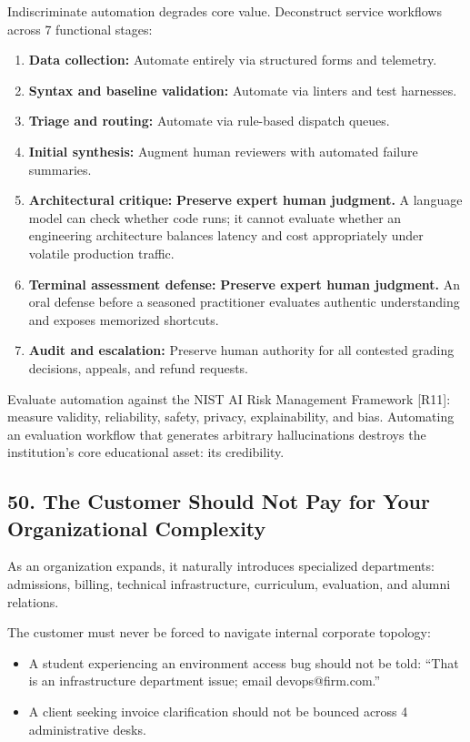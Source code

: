 Indiscriminate automation degrades core value. Deconstruct service workflows across 7 functional stages:
\begin{enumerate}
    \item \textbf{Data collection:} Automate entirely via structured forms and telemetry.
    \item \textbf{Syntax and baseline validation:} Automate via linters and test harnesses.
    \item \textbf{Triage and routing:} Automate via rule-based dispatch queues.
    \item \textbf{Initial synthesis:} Augment human reviewers with automated failure summaries.
    \item \textbf{Architectural critique:} \textbf{Preserve expert human judgment.} A language model can check whether code runs; it cannot evaluate whether an engineering architecture balances latency and cost appropriately under volatile production traffic.
    \item \textbf{Terminal assessment defense:} \textbf{Preserve expert human judgment.} An oral defense before a seasoned practitioner evaluates authentic understanding and exposes memorized shortcuts.
    \item \textbf{Audit and escalation:} Preserve human authority for all contested grading decisions, appeals, and refund requests.
\end{enumerate}

Evaluate automation against the NIST AI Risk Management Framework [R11]: measure validity, reliability, safety, privacy, explainability, and bias. Automating an evaluation workflow that generates arbitrary hallucinations destroys the institution's core educational asset: its credibility.

\subsection*{50. The Customer Should Not Pay for Your Organizational Complexity}

As an organization expands, it naturally introduces specialized departments: admissions, billing, technical infrastructure, curriculum, evaluation, and alumni relations.

The customer must never be forced to navigate internal corporate topology:
\begin{itemize}
    \item A student experiencing an environment access bug should not be told: ``That is an infrastructure department issue; email devops@firm.com.''
    \item A client seeking invoice clarification should not be bounced across 4 administrative desks.
\end{itemize}

